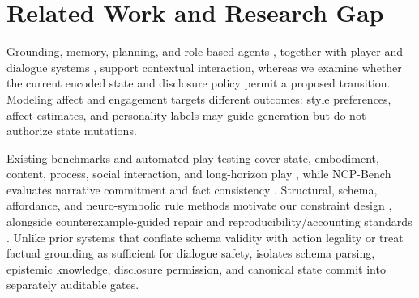 \section{Related Work and Research Gap}
Grounding, memory, planning, and role-based agents \cite{S03_weir2024ontologically,S20_ashby2023personalized,S07_park2023generative,S08_shao2023character}, together with player and dialogue systems \cite{S21_akoury2023player,S22_hochreiter2026beyond,S23_yin2026contextualized,S02_figueiredo2025scaffolded}, support contextual interaction, whereas we examine whether the current encoded state and disclosure policy permit a proposed transition. Modeling affect and engagement \cite{S24_yannakakis2011experiencedriven,S25_melhart2020engagement,S26_wang2026engagement} targets different outcomes: style preferences, affect estimates, and personality labels may guide generation but do not authorize state mutations.

Existing benchmarks and automated play-testing cover state, embodiment, content, process, social interaction, and long-horizon play \cite{S11_cote2019textworld,S12_wang2022scienceworld,S13_fan2022minedojo,S14_perezliebana2019gvgai,S15_liu2024agentbench,S16_ma2024agentboard,S17_zhou2024sotopia,S18_paglieri2025balrog,S19_lepelletier2022playtesting}, while NCP-Bench evaluates narrative commitment and fact consistency \cite{S58_ma2026ncpbench}. Structural, schema, affordance, and neuro-symbolic rule methods motivate our constraint design \cite{S09_geng2023grammar,S10_beurerkellner2023prompting,S36_scholak2021picard,S50_kambhampati2024llmmodulo,S51_ichter2023saycan,S52_wang2025agentspec,S53_li2025settingdc,S54_zhou2025story2game,S42_buongiorno2024pangea}, alongside counterexample-guided repair \cite{S45_madaan2023selfrefine,S48_shinn2023reflexion,S46_chen2023selfdebug,S47_solarlezama2006sketching} and reproducibility/accounting standards \cite{S31_agarwal2021precipice,S33_pineau2021reproducibility,S56_feng2025agentrr,S59_sun2025bdc}. Unlike prior systems that conflate schema validity with action legality or treat factual grounding as sufficient for dialogue safety, \system{} isolates schema parsing, epistemic knowledge, disclosure permission, and canonical state commit into separately auditable gates.
